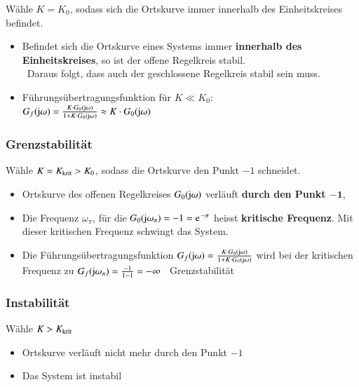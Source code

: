 Wähle $K = K_0$, sodass sich die Ortskurve immer innerhalb des Einheitskreises befindet.
\vspace{0.1cm}
\begin{itemize}
    \item Befindet sich die Ortskurve eines Systems immer \textbf{innerhalb des Einheitskreises}, so ist der offene Regelkreis stabil. \\
        \textrightarrow\ Daraus folgt, dass auch der geschlossene Regelkreis stabil sein muss.
    \item Führungsübertragungsfunktion für $K \ll K_0$:\\
    $G_f(\mathrm{j} \omega) = \frac{K \cdot G_0(\mathrm{j} \omega)}{1 + K \cdot G_0(\mathrm{j} \omega)} \approx K \cdot G_0(\mathrm{j} \omega)$ 
\end{itemize}


\subsubsection{Grenzstabilität}

Wähle $K = K_{\rm krit} > K_0$, sodass die Ortskurve den Punkt $-1$ schneidet.
\vspace{0.1cm}
\begin{itemize}
    \item Ortskurve des offenen Regelkreises $G_0(\mathrm{j} \omega)$ verläuft \textbf{durch den Punkt $\boldsymbol{-1}$}, 
    \item Die Frequenz $\omega_{\pi}$, für die $G_0(\jimg \omega_{\pi})= -1 = \e^{- \pi}$ heisst \textbf{kritische Frequenz}. Mit dieser 
        kritischen Frequenz schwingt das System.
    \item Die Führungsübertragungsfunktion $G_f(\mathrm{j} \omega) = \frac { K \cdot G_0(\mathrm{j} \omega)}{1 + K \cdot G_0(\mathrm{j} \omega)}$ wird bei 
    der kritischen Frequenz zu $G_f(\mathrm{j} \omega_{\pi}) = \frac{-1}{1-1} = - \infty $ \textrightarrow\ Grenzstabilität
\end{itemize}


\subsubsection{Instabilität}

Wähle $K > K_{\rm krit}$
\vspace{0.1cm}
\begin{itemize}
    \item Ortskurve verläuft nicht mehr durch den Punkt $-1$
    \item Das System ist instabil
\end{itemize}


